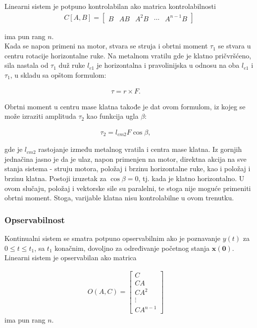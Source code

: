 \documentclass[a4paper,11pt]{article}
\theoremstyle{definition} \newtheorem{deff}{Definicija}[section]
\theoremstyle{definition} \newtheorem{prim}[deff]{Primer}
\theoremstyle{plain} \newtheorem{teor}[deff]{Teorema}
\newcommand{\vect}[1]{\boldsymbol{\mathbf{#1}}}
\begin{document}
	Linearni sistem je potpuno kontrolabilan ako matrica kontrolabilnosti
	\begin{align}
		C[A, B] = \begin{bmatrix}
			B & AB & A^2B & \cdots & A^{n-1}B
		\end{bmatrix} 
	\end{align}
	
	ima pun rang $n$. \\
	
	\clearpage
	Kada se napon primeni na motor, stvara se struja i obrtni moment $\tau_1$ se stvara u centru rotacije horizontalne ruke. Na metalnom vratilu gde je klatno pričvršćeno, sila nastala od $\tau_1$ duž ruke $l_{e1}$ je horizontalna i pravolinijska u odnosu na oba $l_{e1}$ i $\tau_1$, u skladu sa opštom formulom:
	
	\begin{align}
		\tau = r \times F. \quad 
	\end{align}
	
	Obrtni moment u centru mase klatna takođe je dat ovom formulom, iz kojeg se može izraziti amplituda $\tau_2$ kao funkcija ugla $\beta$:
	
	\begin{align}
		\tau_2 = l_{cm2} F \cos \beta, \quad
	\end{align}
	
	
	gde je $l_{cm2}$ rastojanje između metalnog vratila i centra mase klatna. Iz gornjih jednačina jasno je da je ulaz, napon primenjen na motor, direktna akcija na sve stanja sistema - struju motora, položaj i brzinu horizontalne ruke, kao i položaj i brzinu klatna. Postoji izuzetak za $\cos \beta = 0$, tj. kada je klatno horizontalno. U ovom slučaju, položaj i vektorske sile su paralelni, te stoga nije moguće primeniti obrtni moment. Stoga, varijable klatna nisu kontrolabilne u ovom trenutku. \\[16pt]
	
	
	\subsubsection{Opservabilnost}
	
	Kontinualni sistem se smatra potpuno opservabilnim ako je poznavanje $y(t)$ za $0 \leq t \leq t_1$, sa $t_1$ konačnim, dovoljno za određivanje početnog stanja $\vect{x(0)}$. \\
	
	Linearni sistem je opservabilan ako matrica
	
	\begin{align}
		O(A, C) = \begin{bmatrix}
			C \\
			CA \\
			CA^2 \\
			\vdots \\
			CA^{n-1}
		\end{bmatrix} \quad
	\end{align}
	ima pun rang $n$. \\[16pt]
	
\end{document}
